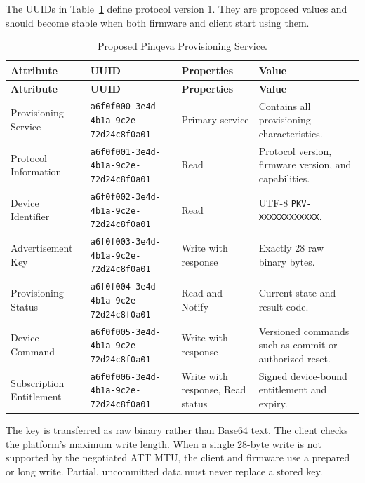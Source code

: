 \documentclass[12pt,a4paper]{article}
\newcommand{\code}[1]{\texttt{#1}}
\begin{document}
The UUIDs in Table~\ref{tab:gatt-service} define protocol version 1. They are
proposed values and should become stable when both firmware and client start
using them.

\begin{longtable}{p{3.2cm}p{5.0cm}p{3.1cm}p{3.2cm}}
    \caption{Proposed Pinqeva Provisioning Service.}
    \label{tab:gatt-service} \\
    \toprule
    \textbf{Attribute} & \textbf{UUID} & \textbf{Properties} &
    \textbf{Value} \\
    \midrule
    \endfirsthead

    \toprule
    \textbf{Attribute} & \textbf{UUID} & \textbf{Properties} &
    \textbf{Value} \\
    \midrule
    \endhead

    Provisioning Service &
    \code{a6f0f000-3e4d-4b1a-9c2e-72d24c8f0a01} &
    Primary service &
    Contains all provisioning characteristics. \\

    Protocol Information &
    \code{a6f0f001-3e4d-4b1a-9c2e-72d24c8f0a01} &
    Read &
    Protocol version, firmware version, and capabilities. \\

    Device Identifier &
    \code{a6f0f002-3e4d-4b1a-9c2e-72d24c8f0a01} &
    Read &
    UTF-8 \code{PKV-XXXXXXXXXXXX}. \\

    Advertisement Key &
    \code{a6f0f003-3e4d-4b1a-9c2e-72d24c8f0a01} &
    Write with response &
    Exactly 28 raw binary bytes. \\

    Provisioning Status &
    \code{a6f0f004-3e4d-4b1a-9c2e-72d24c8f0a01} &
    Read and Notify &
    Current state and result code. \\

    Device Command &
    \code{a6f0f005-3e4d-4b1a-9c2e-72d24c8f0a01} &
    Write with response &
    Versioned commands such as commit or authorized reset. \\

    Subscription Entitlement &
    \code{a6f0f006-3e4d-4b1a-9c2e-72d24c8f0a01} &
    Write with response, Read status &
    Signed device-bound entitlement and expiry. \\
    \bottomrule
\end{longtable}

The key is transferred as raw binary rather than Base64 text. The client checks
the platform's maximum write length. When a single 28-byte write is not
supported by the negotiated ATT MTU, the client and firmware use a prepared or
long write. Partial, uncommitted data must never replace a stored key.
\end{document}
